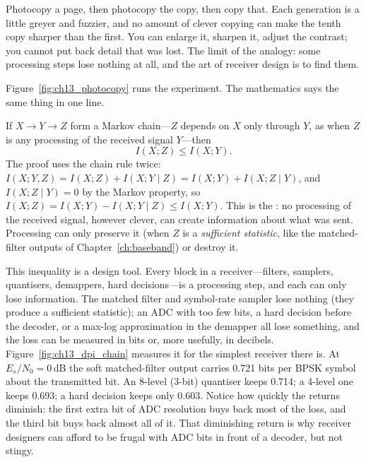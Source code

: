\begin{analogy}
Photocopy a page, then photocopy the copy, then copy that. Each generation is a little greyer
and fuzzier, and no amount of clever copying can make the tenth copy sharper than the first. You
can enlarge it, sharpen it, adjust the contrast; you cannot put back detail that was lost. The
limit of the analogy: some processing steps lose nothing at all, and the art of receiver design
is to find them.
\end{analogy}


Figure~\ref{fig:ch13_photocopy} runs the experiment. The mathematics says the same thing in one line.

If $X\to Y\to Z$ form a Markov chain---$Z$ depends on $X$ only through $Y$, as when $Z$ is any
processing of the received signal $Y$---then
\begin{equation}
I(X;Z)\le I(X;Y).
\label{eq:ch13:dpi}
\end{equation}
The proof uses the chain rule twice:
$I(X;Y,Z)=I(X;Z)+I(X;Y\mid Z)=I(X;Y)+I(X;Z\mid Y)$, and $I(X;Z\mid Y)=0$ by the Markov property,
so $I(X;Z)=I(X;Y)-I(X;Y\mid Z)\le I(X;Y)$. This is the : no
processing of the received signal, however clever, can create information about what was sent.
Processing can only preserve it (when $Z$ is a \emph{sufficient statistic}, like the matched-filter
outputs of Chapter~\ref{ch:baseband}) or destroy it.

This inequality is a design tool. Every block in a receiver---filters, samplers, quantisers,
demappers, hard decisions---is a processing step, and each can only lose information. The matched
filter and symbol-rate sampler lose nothing (they produce a sufficient statistic); an ADC with too
few bits, a hard decision before the decoder, or a max-log approximation in the demapper all lose
something, and the loss can be measured in bits or, more usefully, in decibels.
Figure~\ref{fig:ch13_dpi_chain} measures it for the simplest receiver there is. At
$E_s/N_0=0$\,dB the soft matched-filter output carries 0.721 bits per BPSK symbol about the
transmitted bit. An 8-level (3-bit) quantiser keeps 0.714; a 4-level one keeps 0.693; a hard
decision keeps only 0.603. Notice how quickly the returns diminish: the first extra bit of ADC
resolution buys back most of the loss, and the third bit buys back almost all of it. That
diminishing return is why receiver designers can afford to be frugal with ADC bits in front of a
decoder, but not stingy.


